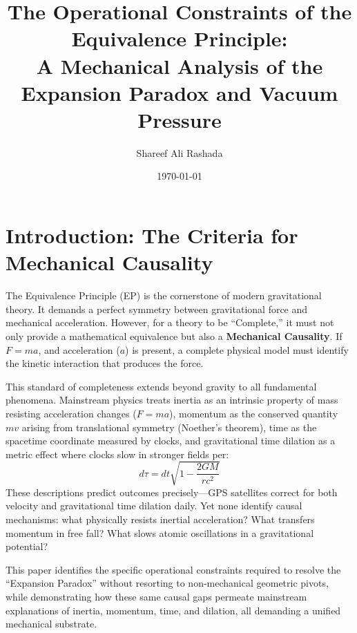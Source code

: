 \documentclass[11pt,a4paper]{article}
\title{\textbf{The Operational Constraints of the Equivalence Principle:}\\ \large A Mechanical Analysis of the Expansion Paradox and Vacuum Pressure}
\author{Shareef Ali Rashada}
\date{\today}
\begin{document}
\maketitle

\section{Introduction: The Criteria for Mechanical Causality}
The Equivalence Principle (EP) is the cornerstone of modern gravitational theory. It demands a perfect symmetry between gravitational force and mechanical acceleration. However, for a theory to be ``Complete,'' it must not only provide a mathematical equivalence but also a \textbf{Mechanical Causality}. If $F=ma$, and acceleration ($a$) is present, a complete physical model must identify the kinetic interaction that produces the force.

This standard of completeness extends beyond gravity to all fundamental phenomena. Mainstream physics treats inertia as an intrinsic property of mass resisting acceleration changes ($F=ma$), momentum as the conserved quantity $mv$ arising from translational symmetry (Noether’s theorem), time as the spacetime coordinate measured by clocks, and gravitational time dilation as a metric effect where clocks slow in stronger fields per:
\begin{equation}
d\tau = dt \sqrt{1 - \frac{2GM}{rc^2}}
\end{equation}
These descriptions predict outcomes precisely---GPS satellites correct for both velocity and gravitational time dilation daily. Yet none identify causal mechanisms: what physically resists inertial acceleration? What transfers momentum in free fall? What slows atomic oscillations in a gravitational potential?

This paper identifies the specific operational constraints required to resolve the ``Expansion Paradox'' without resorting to non-mechanical geometric pivots, while demonstrating how these same causal gaps permeate mainstream explanations of inertia, momentum, time, and dilation, all demanding a unified mechanical substrate.
\end{document}
